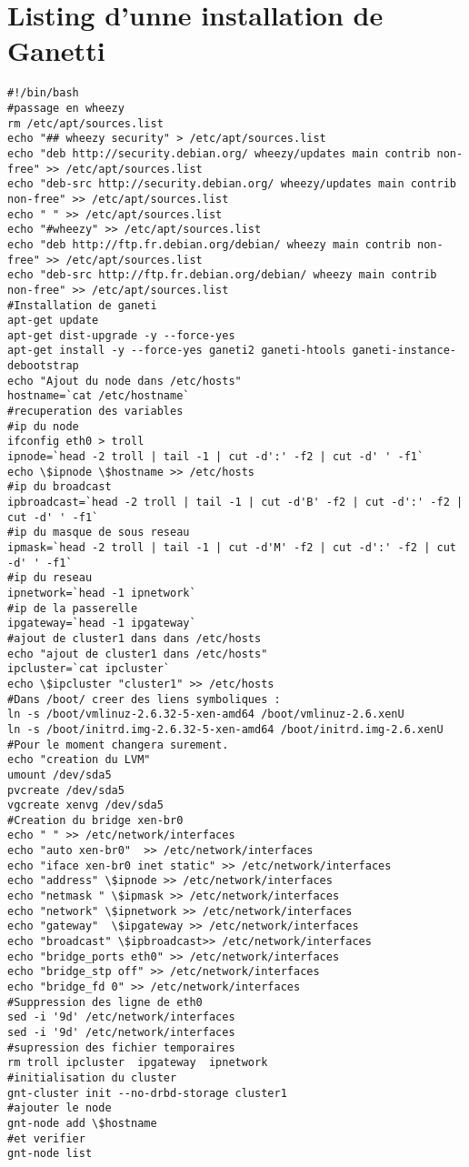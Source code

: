 \section{Listing d'unne installation de Ganetti}
\begin{lstlisting}
#!/bin/bash
#passage en wheezy
rm /etc/apt/sources.list
echo "## wheezy security" > /etc/apt/sources.list
echo "deb http://security.debian.org/ wheezy/updates main contrib non-free" >> /etc/apt/sources.list
echo "deb-src http://security.debian.org/ wheezy/updates main contrib non-free" >> /etc/apt/sources.list
echo " " >> /etc/apt/sources.list
echo "#wheezy" >> /etc/apt/sources.list
echo "deb http://ftp.fr.debian.org/debian/ wheezy main contrib non-free" >> /etc/apt/sources.list
echo "deb-src http://ftp.fr.debian.org/debian/ wheezy main contrib non-free" >> /etc/apt/sources.list
#Installation de ganeti 
apt-get update
apt-get dist-upgrade -y --force-yes
apt-get install -y --force-yes ganeti2 ganeti-htools ganeti-instance-debootstrap
echo "Ajout du node dans /etc/hosts"
hostname=`cat /etc/hostname`
#recuperation des variables
#ip du node
ifconfig eth0 > troll
ipnode=`head -2 troll | tail -1 | cut -d':' -f2 | cut -d' ' -f1`
echo \$ipnode \$hostname >> /etc/hosts
#ip du broadcast
ipbroadcast=`head -2 troll | tail -1 | cut -d'B' -f2 | cut -d':' -f2 | cut -d' ' -f1`
#ip du masque de sous reseau
ipmask=`head -2 troll | tail -1 | cut -d'M' -f2 | cut -d':' -f2 | cut -d' ' -f1`
#ip du reseau
ipnetwork=`head -1 ipnetwork`
#ip de la passerelle
ipgateway=`head -1 ipgateway`
#ajout de cluster1 dans dans /etc/hosts
echo "ajout de cluster1 dans /etc/hosts"
ipcluster=`cat ipcluster`
echo \$ipcluster "cluster1" >> /etc/hosts
#Dans /boot/ creer des liens symboliques :
ln -s /boot/vmlinuz-2.6.32-5-xen-amd64 /boot/vmlinuz-2.6.xenU
ln -s /boot/initrd.img-2.6.32-5-xen-amd64 /boot/initrd.img-2.6.xenU
#Pour le moment changera surement.
echo "creation du LVM"
umount /dev/sda5
pvcreate /dev/sda5
vgcreate xenvg /dev/sda5
#Creation du bridge xen-br0
echo " " >> /etc/network/interfaces
echo "auto xen-br0"  >> /etc/network/interfaces
echo "iface xen-br0 inet static" >> /etc/network/interfaces 
echo "address" \$ipnode >> /etc/network/interfaces
echo "netmask " \$ipmask >> /etc/network/interfaces
echo "network" \$ipnetwork >> /etc/network/interfaces
echo "gateway"  \$ipgateway >> /etc/network/interfaces
echo "broadcast" \$ipbroadcast>> /etc/network/interfaces
echo "bridge_ports eth0" >> /etc/network/interfaces
echo "bridge_stp off" >> /etc/network/interfaces
echo "bridge_fd 0" >> /etc/network/interfaces
#Suppression des ligne de eth0
sed -i '9d' /etc/network/interfaces
sed -i '9d' /etc/network/interfaces
#supression des fichier temporaires
rm troll ipcluster  ipgateway  ipnetwork
#initialisation du cluster
gnt-cluster init --no-drbd-storage cluster1
#ajouter le node 
gnt-node add \$hostname
#et verifier
gnt-node list
\end{lstlisting}

